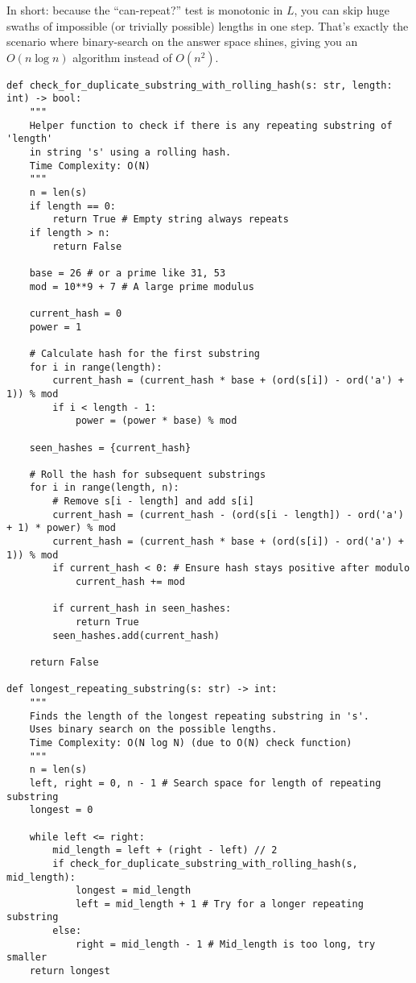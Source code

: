In short: because the “can-repeat?” test is monotonic in \(L\), you can skip huge swaths of impossible (or trivially possible) lengths in one step. That’s exactly the scenario where binary-search on the answer space shines, giving you an \(O(n\log n)\) algorithm instead of \(O(n^2)\).
\begin{verbatim}
def check_for_duplicate_substring_with_rolling_hash(s: str, length: int) -> bool:
    """
    Helper function to check if there is any repeating substring of 'length'
    in string 's' using a rolling hash.
    Time Complexity: O(N)
    """
    n = len(s)
    if length == 0:
        return True # Empty string always repeats
    if length > n:
        return False

    base = 26 # or a prime like 31, 53
    mod = 10**9 + 7 # A large prime modulus

    current_hash = 0
    power = 1

    # Calculate hash for the first substring
    for i in range(length):
        current_hash = (current_hash * base + (ord(s[i]) - ord('a') + 1)) % mod
        if i < length - 1:
            power = (power * base) % mod
    
    seen_hashes = {current_hash}

    # Roll the hash for subsequent substrings
    for i in range(length, n):
        # Remove s[i - length] and add s[i]
        current_hash = (current_hash - (ord(s[i - length]) - ord('a') + 1) * power) % mod
        current_hash = (current_hash * base + (ord(s[i]) - ord('a') + 1)) % mod
        if current_hash < 0: # Ensure hash stays positive after modulo
            current_hash += mod
        
        if current_hash in seen_hashes:
            return True
        seen_hashes.add(current_hash)
    
    return False

def longest_repeating_substring(s: str) -> int:
    """
    Finds the length of the longest repeating substring in 's'.
    Uses binary search on the possible lengths.
    Time Complexity: O(N log N) (due to O(N) check function)
    """
    n = len(s)
    left, right = 0, n - 1 # Search space for length of repeating substring
    longest = 0

    while left <= right:
        mid_length = left + (right - left) // 2
        if check_for_duplicate_substring_with_rolling_hash(s, mid_length):
            longest = mid_length
            left = mid_length + 1 # Try for a longer repeating substring
        else:
            right = mid_length - 1 # Mid_length is too long, try smaller
    return longest
\end{verbatim}
% 
